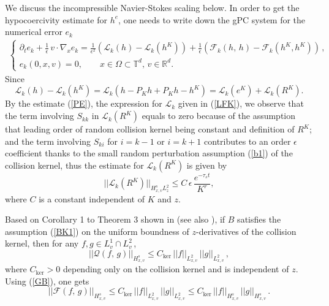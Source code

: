\documentclass[final,onefignum,onetabnum]{siamart171218}
\begin{document}
We discuss the incompressible Navier-Stokes scaling below.
In order to get the hypocoercivity estimate for $h^e$, one needs to write down the gPC system for the numerical error $e_k$
\begin{align}
\label{e_k}
\left\{
\begin{array}{l}
\displaystyle \partial_t e_k +  \frac{1}{\epsilon}\, v\cdot\nabla_x e_k =\frac{1}{\epsilon^2}\left(\mathcal L_{k}(h) -\mathcal L_{k}(h^K)\right) +
\frac{1}{\epsilon}( \mathcal F_{k}(h,\,h) -\mathcal F_{k}(h^K, h^K))\,,  \\[4pt]
\displaystyle e_{k}(0,x,v)=0,  \qquad x\in\Omega\subset\mathbb T^d,  \, v\in \mathbb R^d.
\end{array}\right.
\end{align}
Since 
$$\mathcal L_{k}(h)-\mathcal L_{k}(h^K) = \mathcal L_{k}(h-P_{K}h+P_{K}h-h^K) = \mathcal L_{k}(e^K) + \mathcal L_{k}(R^K). $$
By the estimate (\ref{PE}), the expression for $\mathcal L_{k}$ given in (\ref{LFK}), 
we observe that the term 
involving $S_{kk}$ in $\mathcal L_k(R^K)$ equals to zero because of the assumption that leading order of random collision kernel 
being constant and definition of $R^K$; and the term involving $S_{ki}$ for $i=k-1$ or $i=k+1$ contributes to an order $\epsilon$ coefficient thanks to the
small random perturbation assumption (\ref{b1}) of the collision kernel, thus the estimate for $\mathcal L_{k}(R^K)$ is given by
\begin{equation}\label{LRK} ||\mathcal L_{k}(R^K)||_{H_{x,v}^s L_z^2} \leq C\, \epsilon\,  \frac{e^{-\tau_s t}}{K^r}, 
\end{equation}
where $C$ is a constant independent of $K$ and $z$. 

Based on Corollary 1 to Theorem 3 shown in \cite{Lu} (see also \cite{BD}), if $B$ satisfies the assumption (\ref{BK1}) on
the uniform boundness of  $z$-derivatives of the collision kernel, then for any $f, g \in L_v^1\cap L_v^2$\,,
$$||\mathcal Q(f,\, g)||_{H^s_{x,v}}\leq C_{\text{ker}}\, ||f||_{L^2_{x,v}}\, ||g||_{L^2_{x,v}}\,,$$
where $C_{\text{ker}}>0$ depending only on the collision kernel and is independent of $z$.
Using (\ref{GB}), one gets
\begin{equation}\label{F_Est}
||\mathcal F(f,\,g)||_{H_{x,v}^{s}} \leq C_{\text{ker}}\, ||f||_{L^2_{x,v}}\, ||g||_{L^2_{x,v}} \leq C_{\text{ker}}\, ||f||_{H_{x,v}^{s}}\, ||g||_{H_{x,v}^{s}}\,. 
\end{equation}
\end{document}
